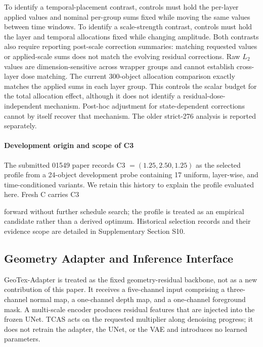 \documentclass[times,twocolumn,final]{elsarticle}
\providecommand{\DIFadd}[1]{{\protect\color{blue} \sf #1}} %
\providecommand{\DIFaddbegin}{} %
\providecommand{\DIFaddend}{} %
\begin{document}
  \DIFaddbegin \DIFadd{To identify a temporal-placement contrast, controls must hold the per-layer applied values and nominal per-group sums fixed while moving the same values between time windows. To identify a scale-strength contrast, controls must hold the layer and temporal allocations fixed while changing amplitude. Both contrasts also require reporting post-scale correction summaries: matching requested values or applied-scale sums does not match the evolving residual corrections. Raw $L_2$ values are dimension-sensitive across wrapper groups and cannot establish cross-layer dose matching. The current 300-object allocation comparison exactly matches the applied sums in each layer group. This controls the scalar budget for }\DIFaddend the  
 \DIFaddbegin \DIFadd{total allocation effect, although it does not identify a residual-dose-independent mechanism. Post-hoc adjustment for state-dependent corrections cannot by itself recover that mechanism. The older strict-276 analysis is reported separately.
}\DIFaddend 

  \DIFaddbegin \paragraph{Development origin and scope of C3}
\DIFadd{The submitted 01549 paper records }\DIFaddend C3  
 \DIFaddbegin \DIFadd{$=(1.25,2.50,1.25)$ as the selected profile from a 24-object development probe containing 17 uniform, layer-wise, and time-conditioned variants. We retain this history to explain the profile evaluated here. Fresh C carries }\DIFaddend C3  

 \DIFaddbegin \DIFadd{forward without further schedule search; the profile is treated as an empirical candidate rather than }\DIFaddend a   \DIFaddbegin \DIFadd{derived optimum. Historical selection records and their evidence scope are detailed in Supplementary Section S10}\DIFaddend .

\DIFaddbegin \subsection{Geometry Adapter and Inference Interface}
\label{subsec:adapterimpl}

\DIFaddend GeoTex-Adapter is   \DIFaddbegin \DIFadd{treated as the fixed geometry-residual backbone, not as a new contribution of this paper}\DIFaddend . It receives a   \DIFaddbegin \DIFadd{five-channel input comprising a three-channel }\DIFaddend normal map, a   \DIFaddbegin \DIFadd{one-channel }\DIFaddend depth map, and a   \DIFaddbegin \DIFadd{one-channel }\DIFaddend foreground mask. A multi-scale   \DIFaddbegin \DIFadd{encoder produces residual features that }\DIFaddend are injected into   \DIFaddbegin \DIFadd{the frozen }\DIFaddend UNet. TCAS acts on the   \DIFaddbegin \DIFadd{requested multiplier along denoising progress; it does not retrain the adapter, the UNet, or the VAE and introduces no learned parameters}\DIFaddend .
\end{document}
